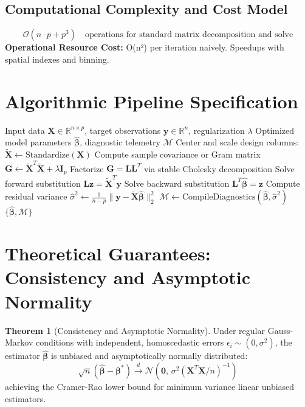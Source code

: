 \documentclass[11pt,a4paper]{article}
\theoremstyle{definition}
\newtheorem{theorem}{\textbf{Theorem}}[section]
\begin{document}
\subsection{Computational Complexity and Cost Model}
\begin{equation}
\mathcal{O}(n \cdot p + p^3) \quad \text{operations for standard matrix decomposition and solve}
\end{equation}
\textbf{Operational Resource Cost:} O(n²) per iteration naively. Speedups with spatial indexes and binning.

\section{Algorithmic Pipeline Specification}

\begin{algorithm}[H]
\caption{Mean shift clustering Execution}
\begin{algorithmic}[1]
\Require Input data $\mathbf{X} \in \mathbb{R}^{n \times p}$, target observations $\mathbf{y} \in \mathbb{R}^n$, regularization $\lambda$
\Ensure Optimized model parameters $\hat{\boldsymbol{\beta}}$, diagnostic telemetry $\mathcal{M}$
\State Center and scale design columns: $\tilde{\mathbf{X}} \gets \text{Standardize}(\mathbf{X})$
\State Compute sample covariance or Gram matrix $\mathbf{G} \gets \tilde{\mathbf{X}}^T \tilde{\mathbf{X}} + \lambda \mathbf{I}_p$
\State Factorize $\mathbf{G} = \mathbf{L} \mathbf{L}^T$ via stable Cholesky decomposition
\State Solve forward substitution $\mathbf{L} \mathbf{z} = \tilde{\mathbf{X}}^T \mathbf{y}$
\State Solve backward substitution $\mathbf{L}^T \hat{\boldsymbol{\beta}} = \mathbf{z}$
\State Compute residual variance $\hat{\sigma}^2 \gets \frac{1}{n - p} \| \mathbf{y} - \tilde{\mathbf{X}} \hat{\boldsymbol{\beta}} \|_2^2$
\State $\mathcal{M} \gets \text{CompileDiagnostics}(\hat{\boldsymbol{\beta}}, \hat{\sigma}^2)$
\State \Return $\{\hat{\boldsymbol{\beta}}, \mathcal{M}\}$
\end{algorithmic}
\end{algorithm}

\section{Theoretical Guarantees: Consistency and Asymptotic Normality}

\begin{theorem}[Consistency and Asymptotic Normality]
Under regular Gauss-Markov conditions with independent, homoscedastic errors $\epsilon_i \sim (0, \sigma^2)$, the estimator $\hat{\boldsymbol{\beta}}$ is unbiased and asymptotically normally distributed:
\begin{equation}
\sqrt{n}(\hat{\boldsymbol{\beta}} - \boldsymbol{\beta}^*) \xrightarrow{d} \mathcal{N}\left(\mathbf{0}, \, \sigma^2 (\mathbf{X}^T \mathbf{X} / n)^{-1}\right)
\end{equation}
achieving the Cramer-Rao lower bound for minimum variance linear unbiased estimators.
\end{theorem}
\end{document}
